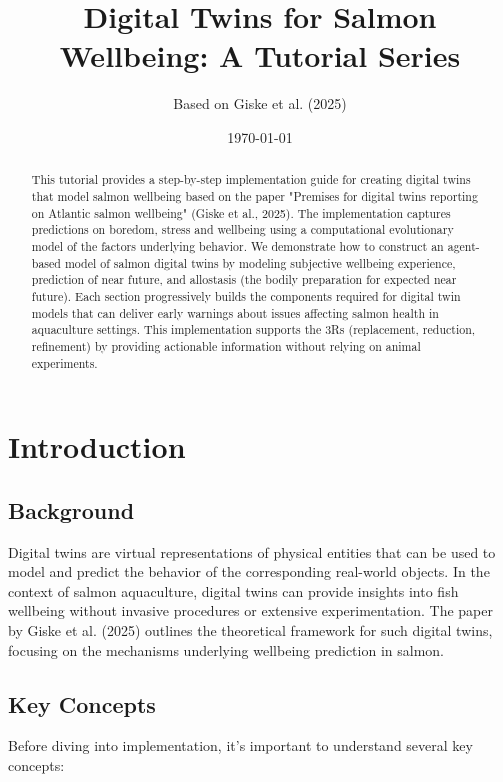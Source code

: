 \documentclass[11pt,a4paper]{article}
\title{Digital Twins for Salmon Wellbeing: A Tutorial Series}
\author{Based on Giske et al. (2025)}
\date{\today}
\begin{document}
\maketitle

\begin{abstract}
This tutorial provides a step-by-step implementation guide for creating digital twins that model salmon wellbeing based on the paper "Premises for digital twins reporting on Atlantic salmon wellbeing" (Giske et al., 2025). The implementation captures predictions on boredom, stress and wellbeing using a computational evolutionary model of the factors underlying behavior. We demonstrate how to construct an agent-based model of salmon digital twins by modeling subjective wellbeing experience, prediction of near future, and allostasis (the bodily preparation for expected near future). Each section progressively builds the components required for digital twin models that can deliver early warnings about issues affecting salmon health in aquaculture settings. This implementation supports the 3Rs (replacement, reduction, refinement) by providing actionable information without relying on animal experiments.
\end{abstract}

\tableofcontents
\newpage

\section{Introduction}
\subsection{Background}
Digital twins are virtual representations of physical entities that can be used to model and predict the behavior of the corresponding real-world objects. In the context of salmon aquaculture, digital twins can provide insights into fish wellbeing without invasive procedures or extensive experimentation. The paper by Giske et al. (2025) \cite{giske2025premises} outlines the theoretical framework for such digital twins, focusing on the mechanisms underlying wellbeing prediction in salmon.


\subsection{Key Concepts}
Before diving into implementation, it's important to understand several key concepts:
\end{document}
